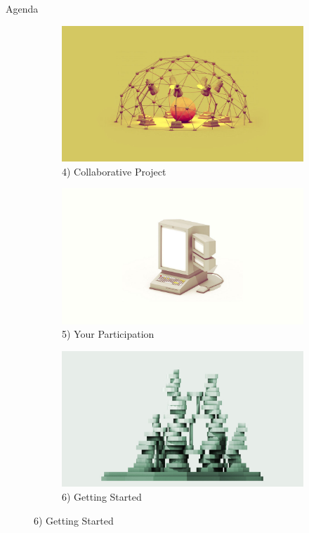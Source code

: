 \begin{frame}{Agenda}
\begin{figure}
	\end{figure}

	\begin{figure}
	
		\centering
		\begin{subfigure}[b]{0.3\textwidth}
			\centering
			\includegraphics[width=\textwidth]{intro/project}
			\caption{\normalsize 4) Collaborative Project}
		\end{subfigure}%
		\quad
		\begin{subfigure}[b]{0.3\textwidth}
			\centering
			\includegraphics[width=\textwidth]{intro/about}
			\caption{\normalsize 5) Your Participation}
		\end{subfigure}
		\quad
		\begin{subfigure}[b]{0.3\textwidth}
			\centering
			\includegraphics[width=\textwidth]{intro/ideas}
			\caption{\normalsize 6) Getting Started}
		\end{subfigure}

	\end{figure}
	
\end{frame}


